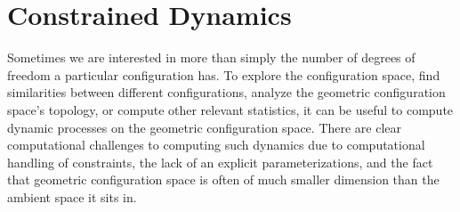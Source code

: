 \section{Constrained Dynamics}

Sometimes we are interested in more than simply the number of degrees of freedom a particular configuration has. To explore the configuration space, find similarities between different configurations, analyze the geometric configuration space's topology, or compute other relevant statistics, it can be useful to compute dynamic processes on the geometric configuration space. There are clear computational challenges to computing such dynamics due to computational handling of constraints, the lack of an explicit parameterizations, and the fact that geometric configuration space is often of much smaller dimension than the ambient space it sits in.





